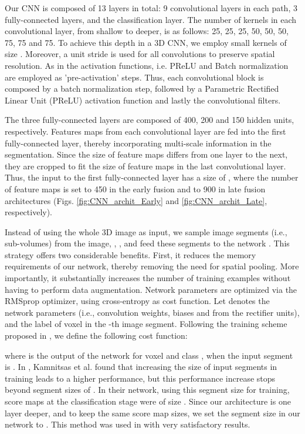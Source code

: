 \documentclass[twoside,espcrc2]{elsarticle}
\newcommand{\vold}[1]{}
\begin{document}
Our CNN is composed of 13 layers in total: 9 convolutional layers in each path, 3 fully-connected layers, and the classification layer. The number of kernels in each convolutional layer, from shallow to deeper, is as follows: 25, 25, 25, 50, 50, 50, 75, 75 and 75. To achieve this depth in a 3D CNN, we employ small kernels of size \vold{3}. Moreover, a unit stride is used for all convolutions to preserve spatial resolution. As in \cite{he2016identity} the activation functions, i.e. PReLU and Batch normalization are employed as 'pre-activation' steps. Thus, each convolutional block is composed by a batch normalization step, followed by a Parametric Rectified Linear Unit (PReLU) activation function and lastly the convolutional filters.

The three fully-connected layers are composed of 400, 200 and 150 hidden units, respectively. Features maps from each convolutional layer are fed into the first fully-connected layer, thereby incorporating multi-scale information in the segmentation. Since the size of feature maps differs from one layer to the next, they are cropped to fit the size of feature maps in the last convolutional layer. Thus, the input to the first fully-connected layer has a size of , where the number of feature maps is set to 450 in the early fusion and to 900 in late fusion architectures (Figs. \ref{fig:CNN_archit_Early} and \ref{fig:CNN_archit_Late}, respectively).

Instead of using the whole 3D image as input, we sample  image segments (i.e., sub-volumes) from the image, , , and feed these segments to the network \cite{kamnitsas2017efficient}. This strategy offers two considerable benefits. First, it reduces the memory requirements of our network, thereby removing the need for spatial pooling. More importantly, it substantially increases the number of training examples without having to perform data augmentation. Network parameters are optimized via the RMSprop optimizer, using cross-entropy as cost function. Let  denotes the network parameters (i.e., convolution weights, biases and  from the rectifier units), and  the label of voxel  in the -th image segment. Following the training scheme proposed in \cite{kamnitsas2017efficient}, we define the following cost function:

where  is the output of the network for voxel  and class , when the input segment is . 
In \cite{kamnitsas2017efficient}, Kamnitsas et al. found that increasing the size of input segments in training leads to a higher 
performance, but this performance increase stops beyond segment sizes of \vold{25}. In their network, using this segment size for training, score
maps at the classification stage were of size \vold{9}. Since our architecture is one layer deeper, and to keep the same score map sizes, we set 
the segment size in our network to \vold{27}. This method was used in \cite{DolzNeuro2017} with very satisfactory results.
\end{document}
